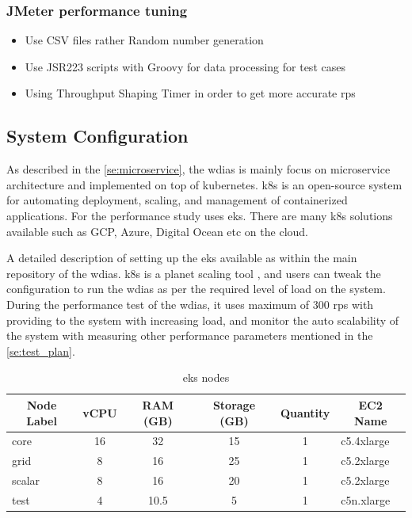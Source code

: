 \subsubsection{JMeter performance tuning}
\begin{itemize}
    \item Use CSV files rather Random number generation
    \item Use JSR223 scripts with Groovy for data processing for test cases
    \item Using Throughput Shaping Timer in order to get more accurate \acrshort{rps}
\end{itemize}

\subsection{System Configuration}
As described in the \ref{se:microservice}, the \acrshort{wdias} is mainly focus on microservice architecture and implemented on top of kubernetes. \acrfull{k8s} is an open-source system for automating deployment, scaling, and management of containerized applications. For the performance study uses \acrfull{eks}. There are many \acrshort{k8s} solutions available such as GCP, Azure, Digital Ocean etc on the cloud.

A detailed description of setting up the \acrshort{eks} available as \cite{KarunarathneWdias/Amazon_EKS.md:EKS} within the main repository of the \acrshort{wdias}.
\acrshort{k8s} is a planet scaling tool \cite{LinuxFoundationProduction-GradeKubernetes}, and users can tweak the configuration to run the \acrshort{wdias} as per the required level of load on the system. During the performance test of the \acrshort{wdias}, it uses maximum of 300 \acrshort{rps} with providing to the system with increasing load, and monitor the auto scalability of the system with measuring other performance parameters mentioned in the \ref{se:test_plan}.

\begin{table}[]
\begin{tabular}{lccccl}
\hline
\multicolumn{1}{c}{\textbf{Node Label}} & \textbf{vCPU} & \textbf{RAM (GB)} & \textbf{Storage (GB)} & \textbf{Quantity} & \multicolumn{1}{c}{\textbf{EC2 Name}} \\ \hline
core & 16 & 32 & 15 & 1 & c5.4xlarge \\
grid & 8 & 16 & 25 & 1 & c5.2xlarge \\
scalar & 8 & 16 & 20 & 1 & c5.2xlarge \\
test & 4 & 10.5 & 5 & 1 & c5n.xlarge \\ \hline
\end{tabular}
\caption{\acrshort{eks} nodes}
\label{tab:aws_eks_nodes}
\end{table}

